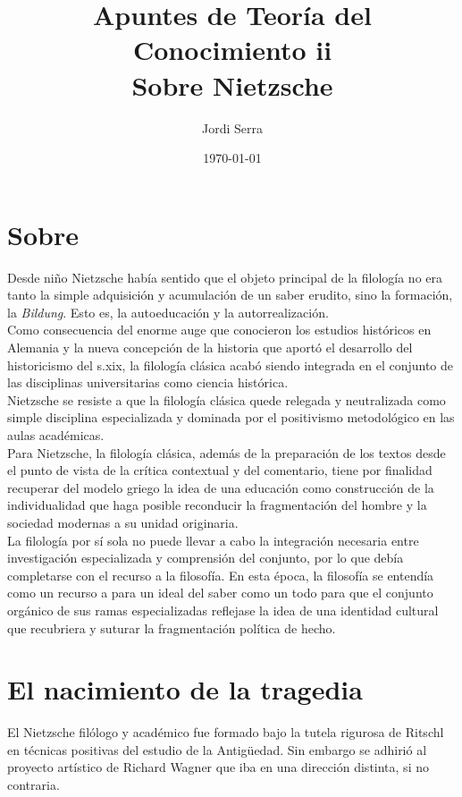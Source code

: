 \documentclass[a4paper, 10pt, twocolumn, spanish]{article}
\author{Jordi Serra}
\date{\today}
\title{Apuntes de Teoría del Conocimiento ii\\\medskip
\large Sobre Nietzsche}
\begin{document}
\maketitle
\tableofcontents


\section{Sobre}
\label{sec:orga99b898}
Desde niño Nietzsche había sentido que el objeto principal de la
filología no era tanto la simple adquisición y acumulación de un saber
erudito, sino la formación, la \emph{Bildung}. Esto es, la autoeducación y
la autorrealización.\\[0pt]
Como consecuencia del enorme auge que conocieron los estudios
históricos en Alemania y la nueva concepción de la historia que aportó
el desarrollo del historicismo del s.xix, la filología clásica acabó
siendo integrada en el conjunto de las disciplinas universitarias como
ciencia histórica.\\[0pt]
Nietzsche se resiste a que la filología clásica quede relegada y
neutralizada como simple disciplina especializada y dominada por el
positivismo metodológico en las aulas académicas.\\[0pt]
Para Nietzsche, la filología clásica, además de la preparación de los
textos desde el punto de vista de la crítica contextual y del
comentario, tiene por finalidad recuperar del modelo griego la idea de
una educación como construcción de la individualidad que haga posible
reconducir la fragmentación del hombre y la sociedad modernas a su
unidad originaria.\\[0pt]
La filología por sí sola no puede llevar a cabo la integración
necesaria entre investigación especializada y comprensión del
conjunto, por lo que debía completarse con el recurso a la
filosofía. En esta época, la filosofía se entendía como un recurso a
para un ideal del saber como un todo para que el conjunto orgánico de
sus ramas especializadas reflejase la idea de una identidad cultural
que recubriera y suturar la fragmentación política de hecho.\\[0pt]


\section{El nacimiento de la tragedia}
\label{sec:orgd93986d}
El Nietzsche filólogo y académico fue formado bajo la tutela rigurosa
de Ritschl en técnicas positivas del estudio de la Antigüedad. Sin
embargo se adhirió al proyecto artístico de Richard Wagner que iba en
una dirección distinta, si no contraria.\\[0pt]
\end{document}
